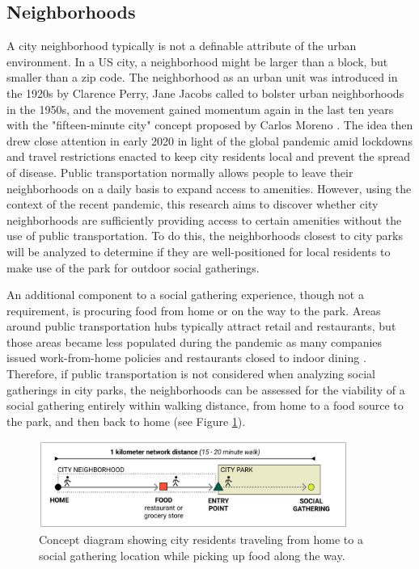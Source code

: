 \begin{multicols}{2}
\subsection{Neighborhoods}
A city neighborhood typically is not a definable attribute of the urban environment. In a US city, a neighborhood might be larger than a block, but smaller than a zip code. The neighborhood as an urban unit was introduced in the 1920s by Clarence Perry, Jane Jacobs called to bolster urban neighborhoods in the 1950s, and the movement gained momentum again in the last ten years with the "fifteen-minute city" concept proposed by Carlos Moreno \cite{jacobs_death_2020}\cite{moreno_introducing_2021}\cite{pozoukidou_15-minute_2021}. The idea then drew close attention in early 2020 in light of the global pandemic amid lockdowns and travel restrictions enacted to keep city residents local and prevent the spread of disease. Public transportation normally allows people to leave their neighborhoods on a daily basis to expand access to amenities. However, using the context of the recent pandemic, this research aims to discover whether city neighborhoods are sufficiently providing access to certain amenities without the use of public transportation. To do this, the neighborhoods closest to city parks will be analyzed to determine if they are well-positioned for local residents to make use of the park for outdoor social gatherings. 

An additional component to a social gathering experience, though not a requirement, is procuring food from home or on the way to the park. Areas around public transportation hubs typically attract retail and restaurants, but those areas became less populated during the pandemic as many companies issued work-from-home policies and restaurants closed to indoor dining \cite{hidalgo_amenity_2020}. Therefore, if public transportation is not considered when analyzing social gatherings in city parks, the neighborhoods can be assessed for the viability of a social gathering entirely within walking distance, from home to a food source to the park, and then back to home (see Figure \ref{fig:concept_diagram}).

\end{multicols}

 \begin{figure}[h!]
  \centering
  \includegraphics[width=0.9\textwidth]{images/introduction/concept_diagram.png}
  \captionsetup{width=0.9\linewidth}
  \caption[Concept diagram]{Concept diagram showing city residents traveling from home to a social gathering location while picking up food along the way.}
  \label{fig:concept_diagram}
\end{figure}\par

